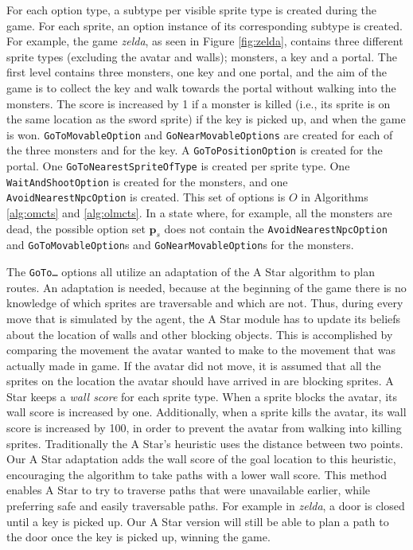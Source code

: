 For each option type, a subtype per visible sprite type is created during the
game. For each sprite, an option instance of its corresponding subtype is
created. For example, the game \textit{zelda}, as seen in Figure \ref{fig:zelda},
contains three different sprite types (excluding the avatar and walls);
monsters, a key and a portal. The first level contains three monsters, one key
and one portal, and the aim of the game is to collect the key and walk towards
the portal without walking into the monsters. The score is increased by 1 if a
monster is killed (i.e., its sprite is on the same location as the sword sprite)
if the key is picked up, and when the game is won. \texttt{GoToMovableOption} and
\texttt{GoNearMovableOptions} are created for each of the three monsters and
for the key. A \texttt{GoToPositionOption} is created for the portal.  One
\texttt{GoToNearestSpriteOfType} is created per sprite type. One
\texttt{WaitAndShootOption} is created for the monsters, and one
\texttt{AvoidNearestNpcOption} is created. This set of options is $O$ in
Algorithms \ref{alg:omcts} and \ref{alg:olmcts}. In a state where, for example,
all the monsters are dead, the possible option set $\mathbf{p}_s$ does not
contain the \texttt{AvoidNearestNpcOption} and \texttt{GoToMovableOption}s and
\texttt{GoNearMovableOption}s for the monsters.

The \texttt{GoTo\ldots} options all utilize an adaptation of the A Star
algorithm to plan routes. An adaptation is needed, because at the beginning of
the game there is no knowledge of which sprites are traversable and which are
not. Thus, during every move that is simulated by the agent, the A Star module
has to update its beliefs about the location of walls and other blocking
objects. This is accomplished by comparing the movement the avatar wanted to
make to the movement that was actually made in game. If the avatar did not move,
it is assumed that all the sprites on the location the avatar should have
arrived in are blocking sprites. A Star keeps a \emph{wall score} for each
sprite type. When a sprite blocks the avatar, its wall score is increased by
one. Additionally, when a sprite kills the avatar, its wall score is increased
by 100, in order to prevent the avatar from walking into killing sprites.
Traditionally the A Star's heuristic uses the distance between two points. Our A
Star adaptation adds the wall score of the goal location to this heuristic,
encouraging the algorithm to take paths with a lower wall score. This method
enables A Star to try to traverse paths that were unavailable earlier, while
preferring safe and easily traversable paths. For example in \textit{zelda}, a
door is closed until a key is picked up. Our A Star version will still be able
to plan a path to the door once the key is picked up, winning the game.


